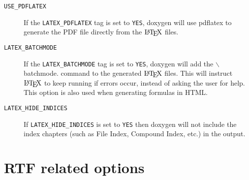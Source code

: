 \begin{description}
\label{config_cfg_use_pdflatex}
\hypertarget{config_cfg_use_pdflatex}{}
 \item[{\tt USE\_\-PDFLATEX} ]

If the {\tt LATEX\_\-PDFLATEX} tag is set to {\tt YES}, doxygen will use pdflatex to generate the PDF file directly from the $\mbox{\LaTeX}$ files.

\label{config_cfg_latex_batchmode}
\hypertarget{config_cfg_latex_batchmode}{}
 \item[{\tt LATEX\_\-BATCHMODE} ]

If the {\tt LATEX\_\-BATCHMODE} tag is set to {\tt YES}, doxygen will add the $\backslash$batchmode. command to the generated $\mbox{\LaTeX}$ files. This will instruct $\mbox{\LaTeX}$ to keep running if errors occur, instead of asking the user for help. This option is also used when generating formulas in HTML.

\label{config_cfg_latex_hide_indices}
\hypertarget{config_cfg_latex_hide_indices}{}
 \item[{\tt LATEX\_\-HIDE\_\-INDICES} ]

If {\tt LATEX\_\-HIDE\_\-INDICES} is set to {\tt YES} then doxygen will not include the index chapters (such as File Index, Compound Index, etc.) in the output.

\end{description}
\hypertarget{config_rtf_output}{}\section{RTF related options}\label{config_rtf_output}
\label{config_cfg_generate_rtf}
\hypertarget{config_cfg_generate_rtf}{}
